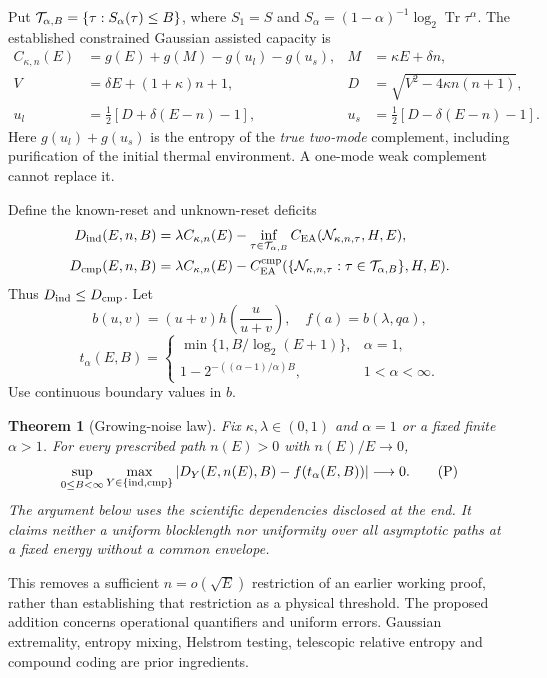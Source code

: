 \documentclass[11pt]{article}
\newtheorem{theorem}{Theorem}
\newcommand{\Tr}{\operatorname{Tr}}
\newcommand{\CEA}{C_{\mathrm{EA}}}
\newcommand{\cmp}{\mathrm{cmp}}
\begin{document}
Put \({\cal T}_{\alpha,B}=\{\tau:S_\alpha(\tau)\le B\}\), where
\(S_1=S\) and \(S_\alpha=(1-\alpha)^{-1}\log_2\Tr\tau^\alpha\).
The established constrained Gaussian assisted capacity
\cite{hw,hs} is
\begin{align}
 C_{\kappa,n}(E)&=g(E)+g(M)-g(u_l)-g(u_s),&
 M&=\kappa E+\delta n,\tag{C}\label{eq:C}\\
 V&=\delta E+(1+\kappa)n+1,&
 D&=\sqrt{V^2-4\kappa n(n+1)},\nonumber\\
 u_l&=\tfrac12[D+\delta(E-n)-1],&
 u_s&=\tfrac12[D-\delta(E-n)-1].\nonumber
\end{align}
Here \(g(u_l)+g(u_s)\) is the entropy of the \emph{true two-mode}
complement, including purification of the initial thermal environment.
A one-mode weak complement cannot replace it.

Define the known-reset and unknown-reset deficits
\[
\begin{split}
 D_{\rm ind}(E,n,B)&=\lambda C_{\kappa,n}(E)-
       \inf_{\tau\in{\cal T}_{\alpha,B}}\CEA({\cal N}_{\kappa,n,\tau},H,E),\\
 D_{\cmp}(E,n,B)&=\lambda C_{\kappa,n}(E)-
       \CEA^{\cmp}(\{{\cal N}_{\kappa,n,\tau}:\tau\in{\cal T}_{\alpha,B}\},H,E).
\end{split}
\]
Thus \(D_{\rm ind}\le D_{\cmp}\). Let
\[
 b(u,v)=(u+v)h\!\left(\frac{u}{u+v}\right),\quad f(a)=b(\lambda,qa),
\]
\[
 t_\alpha(E,B)=
 \begin{cases}
 \min\{1,B/\log_2(E+1)\},&\alpha=1,\\
 1-2^{-((\alpha-1)/\alpha)B},&1<\alpha<\infty .
 \end{cases}
\]
Use continuous boundary values in \(b\).
\begin{theorem}[Growing-noise law]\label{thm:main}
Fix \(\kappa,\lambda\in(0,1)\) and \(\alpha=1\) or a fixed finite
\(\alpha>1\). For every prescribed path \(n(E)>0\) with \(n(E)/E\to0\),
\[
 \sup_{0\le B<\infty}\max_{Y\in\{{\rm ind},\cmp\}}
 \left|D_Y(E,n(E),B)-f(t_\alpha(E,B))\right|\longrightarrow0.
 \tag{P}\label{eq:P}
\]
The argument below uses the scientific dependencies disclosed at the end.
It claims neither a uniform blocklength nor uniformity over
all asymptotic paths at a fixed energy without a common envelope.
\end{theorem}
This removes a sufficient \(n=o(\sqrt E)\) restriction of an earlier
working proof, rather than establishing that restriction as a physical
threshold. The proposed addition concerns operational quantifiers and
uniform errors. Gaussian extremality, entropy mixing, Helstrom testing,
telescopic relative entropy and compound coding are prior ingredients.
\end{document}

